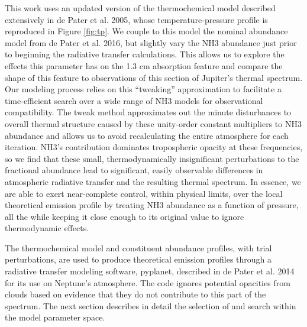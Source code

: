 \documentclass{article}
\begin{document}
	This work uses an updated version of the thermochemical model described extensively in de Pater et al. 2005, whose temperature-pressure profile is reproduced in Figure \ref{fig:tp}.
	We couple to this model the nominal abundance model from de Pater et al. 2016, but slightly vary the NH3 abundance just prior to beginning the radiative transfer calculations.
	This allows us to explore the effects this parameter has on the 1.3 cm absorption feature and compare the shape of this feature to observations of this section of Jupiter's thermal spectrum.
	Our modeling process relies on this ``tweaking'' approximation to facilitate a time-efficient search over a wide range of NH3 models for observational compatibility.
	The tweak method approximates out the minute disturbances to overall thermal structure caused by these unity-order constant multipliers to NH3 abundance and allows us to avoid recalculating the entire atmosphere for each iteration.
	NH3's contribution dominates tropospheric opacity at these frequencies, so we find that these small, thermodynamically insignificant perturbations to the fractional abundance lead to significant, easily observable differences in atmospheric radiative transfer and the resulting thermal spectrum.
	In essence, we are able to exert near-complete control, within physical limits, over the local theoretical emission profile by treating NH3 abundance as a function of pressure, all the while keeping it close enough to its original value to ignore thermodynamic effects.

	The thermochemical model and constituent abundance profiles, with trial perturbations, are used to produce theoretical emission profiles through a radiative transfer modeling software, pyplanet, described in de Pater et al. 2014 for its use on Neptune's atmosphere.
	The code ignores potential opacities from clouds based on evidence that they do not contribute to this part of the spectrum.
	The next section describes in detail the selection of and search within the model parameter space.
\end{document}
